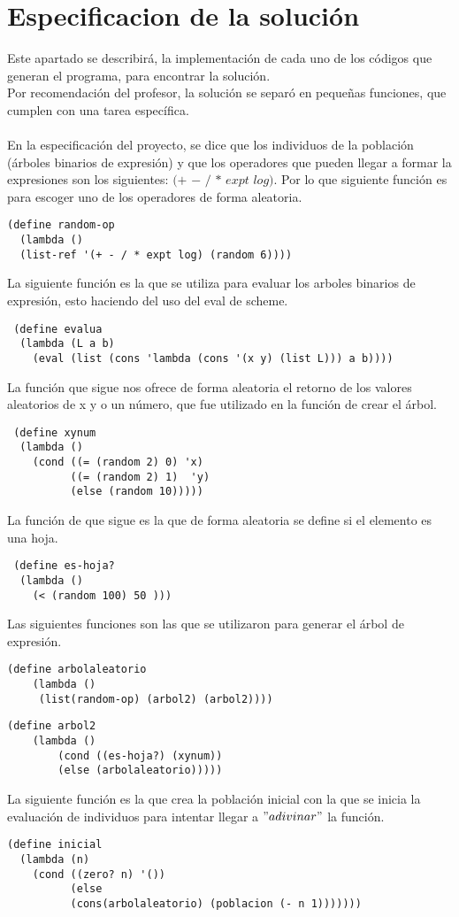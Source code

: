 \documentclass[10pt,a4paper]{article}
\begin{document}
\section{Especificacion de la solución}
 Este apartado se describirá, la implementación de cada uno de los códigos que generan el programa, para encontrar la solución.\\
Por recomendación del profesor, la solución se separó en pequeñas funciones, que cumplen con una tarea específica.\\\\
En la especificación del proyecto, se dice que los individuos de la población (árboles binarios de expresión) y que los operadores que pueden llegar a formar la expresiones son los siguientes: $(+$ $-$ $/$ $*$ $expt$ $log)$. Por lo que siguiente función es para escoger uno de los operadores de forma aleatoria.  
\begin{verbatim}
(define random-op
  (lambda ()
  (list-ref '(+ - / * expt log) (random 6))))
\end{verbatim}
 La siguiente función es la que se utiliza para evaluar los arboles binarios de expresión, esto haciendo del uso del eval de scheme. 
 \begin{verbatim}
 (define evalua
  (lambda (L a b)
    (eval (list (cons 'lambda (cons '(x y) (list L))) a b))))
 \end{verbatim}
 La función que sigue nos ofrece de forma aleatoria el retorno de los valores aleatorios de x y o un número, que fue utilizado en la función de crear el árbol.
 \begin{verbatim}
 (define xynum
  (lambda ()
    (cond ((= (random 2) 0) 'x)
          ((= (random 2) 1)  'y)
          (else (random 10)))))
\end{verbatim}
 La función de que sigue es la que de forma aleatoria se define si el elemento es una hoja. 
 \begin{verbatim}
 (define es-hoja?
  (lambda ()
    (< (random 100) 50 )))
 \end{verbatim}
 Las siguientes funciones son las que se utilizaron para generar el árbol de expresión.
 \begin{verbatim}
(define arbolaleatorio
	(lambda ()
	 (list(random-op) (arbol2) (arbol2))))
\end{verbatim}
\begin{verbatim}
(define arbol2
	(lambda ()
		(cond ((es-hoja?) (xynum))
		(else (arbolaleatorio)))))
\end{verbatim}  
La siguiente función es la que crea la población inicial con la que se inicia la evaluación de individuos para intentar llegar a $"adivinar"$ la función.
\begin{verbatim}
(define inicial
  (lambda (n)
    (cond ((zero? n) '())
          (else
          (cons(arbolaleatorio) (poblacion (- n 1)))))))
\end{verbatim}
\end{document}
